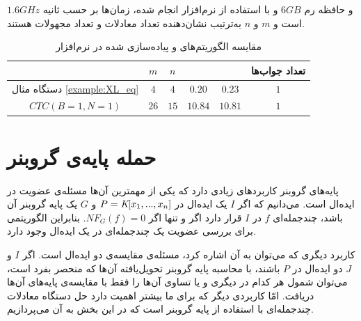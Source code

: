 $1.6GHz$
و حافظه رم 
$6GB$
و با استفاده از نرم‌افزار 
انجام شده، زمان‌ها بر حسب ثانیه است و 
$m$
و 
$n$
به‌ترتیب نشان‌دهنده تعداد معادلات و تعداد مجهولات هستند. 
\begin{table}
\begin{center}
\begin{tabular}{||c||c|c|c|c|c||}
	\hline 
	& $m$ & $n$ & \en{XL} & \en{MXL}&
	{\footnotesize تعداد جواب‌ها} \\ 
	\hline 
	\hline
	دستگاه مثال
	\ref{example:XL_eq}
	 & $4$ & $4$ & $0.20$ & $0.23$ &
	 $1$\\ 
	\hline 
	{\footnotesize $ CTC(B = 1, N = 1)$} & $26$ & $15$ & $10.84$ & $10.81$ &
	$1$\\ 
	\hline 
\end{tabular} 
\end{center} 
	\caption{مقایسه الگوریتم‌های 
و 
پیاده‌سازی شده در نرم‌افزار 
}
	\label{tab:comparison_between_XL_and_MXL}
\end{table}
 



\section{حمله‌  پایه‌ی گروبنر}
پایه‌های گروبنر کاربردهای زیادی دارد که یکی از مهمترین آن‌ها مسئله‌ی عضویت در ایده‌ال است. می‌دانیم که اگر 
$I$
یک ایده‌ال در 
$P = \textit{K}[x_{1},...,x_{n}]$
و 
$G$
یک پایه‌  گروبنر آن‌ باشد، چندجمله‌ای‌ 
$f$
در 
$I$
قرار دارد اگر و تنها اگر
$NF_{G}(f) = 0$.
بنابراین الگوریتمی برای بررسی عضویت یک چندجمله‌ای در یک ایده‌ال وجود دارد. 

کاربرد دیگری که می‌توان به آن اشاره کرد، مسئله‌ی مقایسه‌ی دو ایده‌ال است. اگر 
$I$
و
$J$
دو ایده‌ال در 
$P$
باشند، با محاسبه‌  پایه‌  گروبنر تحویل‌یافته‌  آن‌ها که منحصر بفرد است، می‌توان شمول هر کدام در دیگری و یا تساوی آن‌ها را فقط با مقایسه‌ی پایه‌های آن‌ها دریافت.
امّا کاربردی دیگر که برای ما بیشتر اهمیت دارد حل دستگاه معادلات چندجمله‌ای با استفاده از پایه‌  گروبنر است که در این بخش به آن می‌پردازیم.


